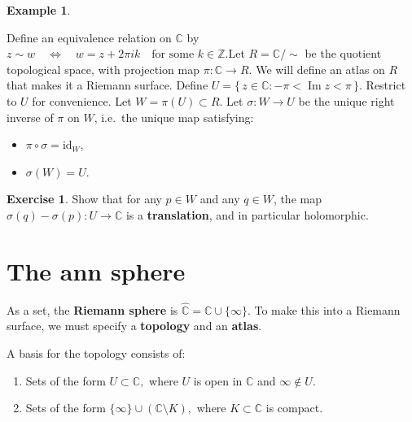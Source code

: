 \documentclass[
]{book}
\providecommand{\tightlist}{%
  \setlength{\itemsep}{0pt}\setlength{\parskip}{0pt}}
\theoremstyle{definition}
\theoremstyle{definition}
\newtheorem{example}{Example}[chapter]
\theoremstyle{definition}
\newtheorem{exercise}{Exercise}[chapter]
\theoremstyle{definition}
\theoremstyle{remark}
\begin{document}
\begin{example}
\protect\hypertarget{exm:unnamed-chunk-6}{}\label{exm:unnamed-chunk-6}

Define an equivalence relation on \(\mathbb{C}\) by \(z \sim w \quad \Longleftrightarrow \quad w = z + 2\pi i k \quad \text{for some } k \in \mathbb{Z}.\)Let \(R = \mathbb{C} / \!\sim\)
be the quotient topological space, with projection map \(\pi : \mathbb{C} \to R.\) We will define an atlas on \(R\) that makes it a Riemann surface. Define \(U = \{\, z \in \mathbb{C} : -\pi < \operatorname{Im} z < \pi \,\}.\) Restrict to \(U\) for convenience. Let \(W = \pi(U) \subset R.\) Let \(\sigma : W \to U\) be the unique right inverse of \(\pi\) on \(W\), i.e.~the unique map satisfying:

\begin{itemize}
\tightlist
\item
  \(\pi \circ \sigma = \mathrm{id}_W\),
\item
  \(\sigma(W) = U\).
\end{itemize}

\end{example}

\begin{exercise}
\protect\hypertarget{exr:unnamed-chunk-7}{}\label{exr:unnamed-chunk-7}Show that for any \(p \in W\) and any \(q \in W\), the map \(\sigma(q) - \sigma(p) : U \longrightarrow \mathbb{C}\) is a \textbf{translation}, and in particular holomorphic.
\end{exercise}

\section{The ann sphere}\label{the-ann-sphere}

As a set, the \textbf{Riemann sphere} is \(\widehat{\mathbb{C}} = \mathbb{C} \cup \{\infty\}.\) To make this into a Riemann surface, we must specify a \textbf{topology} and an \textbf{atlas}.

A basis for the topology consists of:

\begin{enumerate}
\def\labelenumi{\arabic{enumi}.}
\item
  Sets of the form \(U \subset \mathbb{C},\)
  where \(U\) is open in \(\mathbb{C}\) and \(\infty \notin U\).
\item
  Sets of the form \(\{\infty\} \cup (\mathbb{C} \setminus K),\) where \(K \subset \mathbb{C}\) is compact.
\end{enumerate}
\end{document}
